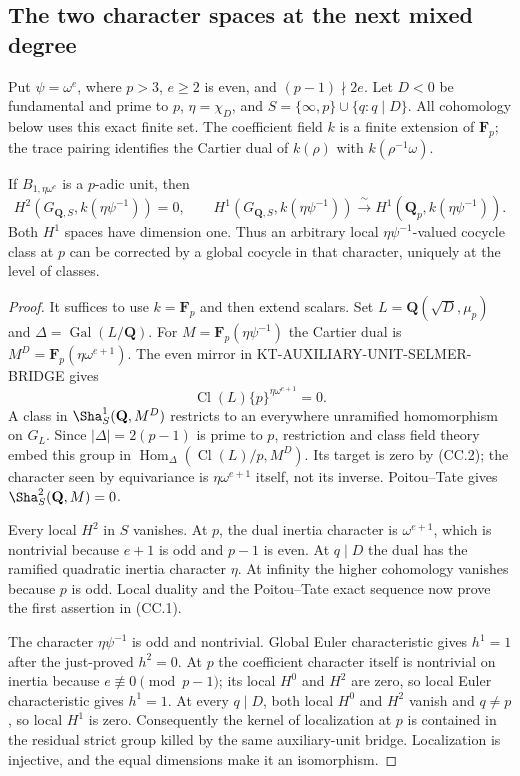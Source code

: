 \subsection{The two character spaces at the next mixed degree}
\label{sec:kt-cubic-cohomology}

Put $\psi=\omega^e$, where $p>3$, $e\ge2$ is even, and
$(p-1)\nmid2e$.  Let $D<0$ be fundamental and prime to $p$,
$\eta=\chi_D$, and
$S=\{\infty,p\}\cup\{q:q\mid D\}$.  All cohomology below uses
this exact finite set.  The coefficient field $k$ is a finite extension
of $\mathbf F_p$; the trace pairing identifies the Cartier dual of
$k(\rho)$ with $k(\rho^{-1}\omega)$.

\begin{lemma}
If $B_{1,\eta\omega^e}$ is a $p$-adic unit, then
\[
 H^2(G_{\mathbf Q,S},k(\eta\psi^{-1}))=0,
 \qquad
 H^1(G_{\mathbf Q,S},k(\eta\psi^{-1}))
   \xrightarrow{\;\sim\;}
 H^1(\mathbf Q_p,k(\eta\psi^{-1})).                \tag{CC.1}
\]
Both $H^1$ spaces have dimension one.  Thus an arbitrary local
$\eta\psi^{-1}$-valued cocycle class at $p$ can be corrected by a
global cocycle in that character, uniquely at the level of classes.
\end{lemma}
\begin{proof}
It suffices to use $k=\mathbf F_p$ and then extend scalars.
Set $L=\mathbf Q(\sqrt D,\mu_p)$ and
$\Delta=\operatorname{Gal}(L/\mathbf Q)$.
For $M=\mathbf F_p(\eta\psi^{-1})$ the Cartier dual is
$M^D=\mathbf F_p(\eta\omega^{e+1})$.
The even mirror in KT-AUXILIARY-UNIT-SELMER-BRIDGE gives
\[
          \operatorname{Cl}(L)\{p\}^{\eta\omega^{e+1}}=0.
                                                               \tag{CC.2}
\]
A class in $\Sha^1_S(\mathbf Q,M^D)$ restricts to an everywhere
unramified homomorphism on $G_L$.  Since $|\Delta|=2(p-1)$ is
prime to $p$, restriction and class field theory embed this group
in $\operatorname{Hom}_\Delta(\operatorname{Cl}(L)/p,M^D)$.
Its target is zero by (CC.2); the character seen by equivariance
is $\eta\omega^{e+1}$ itself, not its inverse.
Poitou--Tate gives $\Sha^2_S(\mathbf Q,M)=0$.

Every local $H^2$ in $S$ vanishes.  At $p$, the dual inertia
character is $\omega^{e+1}$, which is nontrivial because $e+1$
is odd and $p-1$ is even.  At $q\mid D$ the dual has the ramified
quadratic inertia character $\eta$.  At infinity the higher
cohomology vanishes because $p$ is odd.  Local duality and the
Poitou--Tate exact sequence now prove the first assertion in
(CC.1).

The character $\eta\psi^{-1}$ is odd and nontrivial.  Global
Euler characteristic gives $h^1=1$ after the just-proved $h^2=0$.
At $p$ the coefficient character itself is nontrivial on inertia
because $e\not\equiv0\pmod{p-1}$; its local $H^0$ and $H^2$
are zero, so local Euler characteristic gives $h^1=1$.
At every $q\mid D$, both local $H^0$ and $H^2$ vanish and
$q\ne p$, so local $H^1$ is zero.
Consequently the kernel of localization at $p$ is contained in
the residual strict group killed by the same auxiliary-unit
bridge.  Localization is injective, and the equal dimensions
make it an isomorphism.
\end{proof}

